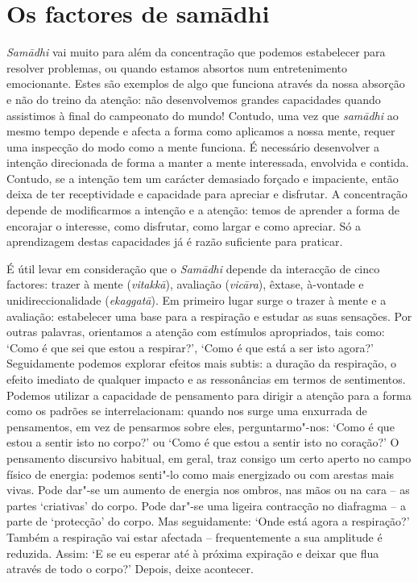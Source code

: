 \section{Os factores de samādhi}

\emph{Samādhi} vai muito para além da concentração que podemos estabelecer para
resolver problemas, ou quando estamos absortos num entretenimento emocionante.
Estes são exemplos de algo que funciona através da nossa absorção e não do
treino da atenção: não desenvolvemos grandes capacidades quando assistimos à
final do campeonato do mundo! Contudo, uma vez que \emph{samādhi} ao mesmo tempo
depende e afecta a forma como aplicamos a nossa mente, requer uma inspecção do
modo como a mente funciona. É necessário desenvolver a intenção direcionada de
forma a manter a mente interessada, envolvida e contida. Contudo, se a intenção
tem um carácter demasiado forçado e impaciente, então deixa de ter receptividade
e capacidade para apreciar e disfrutar. A concentração depende de modificarmos a
intenção e a atenção: temos de aprender a forma de encorajar o interesse, como
disfrutar, como largar e como apreciar. Só a aprendizagem destas capacidades já
é razão suficiente para praticar.

É útil levar em consideração que o \emph{Samādhi} depende da interacção de cinco
factores: trazer à mente (\emph{vitakkā}), avaliação (\emph{vicāra}), êxtase,
à-vontade e unidireccionalidade (\emph{ekaggatā}). Em primeiro lugar surge o
trazer à mente e a avaliação: estabelecer uma base para a respiração e estudar
as suas sensações. Por outras palavras, orientamos a atenção com estímulos
apropriados, tais como: `Como é que sei que estou a respirar?', `Como é que está
a ser isto agora?' Seguidamente podemos explorar efeitos mais subtis: a duração
da respiração, o efeito imediato de qualquer impacto e as ressonâncias em termos
de sentimentos. Podemos utilizar a capacidade de pensamento para dirigir a
atenção para a forma como os padrões se interrelacionam: quando nos surge uma
enxurrada de pensamentos, em vez de pensarmos sobre eles, perguntarmo"-nos: `Como
é que estou a sentir isto no corpo?' ou `Como é que estou a sentir isto no
coração?' O pensamento discursivo habitual, em geral, traz consigo um certo
aperto no campo físico de energia: podemos senti"-lo como mais energizado ou com
arestas mais vivas. Pode dar"-se um aumento de energia nos ombros, nas mãos ou na
cara -- as partes `criativas' do corpo. Pode dar"-se uma ligeira contracção no
diafragma -- a parte de `protecção' do corpo. Mas seguidamente: `Onde está agora
a respiração?' Também a respiração vai estar afectada -- frequentemente a sua
amplitude é reduzida. Assim: `E se eu esperar até à próxima expiração e deixar
que flua através de todo o corpo?' Depois, deixe acontecer.

